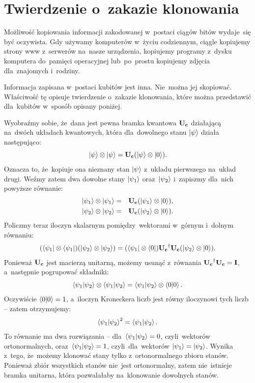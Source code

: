 \section{Twierdzenie o~zakazie klonowania}
Możliwość kopiowania informacji zakodowanej w~postaci ciągów bitów wydaje~się być oczywista.
Gdy używamy komputerów w~życiu codziennym, ciągle kopiujemy strony www z~serwerów na~nasze urządzenia,
kopiujemy programy z~dysku komputera do~pamięci operacyjnej lub~po~prostu kopiujemy zdjęcia dla~znajomych i~rodziny.

Informacja zapisana w~postaci kubitów jest inna. Nie~można jej skopiować. Właściwość tę opisuje
twierdzenie o~zakazie klonowania, które można przedstawić dla~kubitów w~sposób opisany poniżej.

Wyobraźmy sobie, że~dana jest pewna bramka kwantowa $\mathbf{U_c}$ działającą
na~dwóch układach kwantowych, która dla~dowolnego stanu $\ket{\psi}$
działa następująco:
$$
	\ket{\psi}\otimes \ket{\psi} = \mathbf{U_c} (\ket{\psi}\otimes\ket{0}).
$$
Oznacza to, że~kopiuje ona nieznany stan $\ket{\psi}$ z~układu pierwszego na~układ drugi.
Weźmy zatem dwa dowolne stany $\ket{\psi_1}$ oraz~$\ket{\psi_2}$ i~zapiszmy dla~nich powyższe równanie:
\begin{eqnarray}
	\ket{\psi_1}\otimes \ket{\psi_1} &=& \mathbf{U_c} (\ket{\psi_1}\otimes\ket{0}),\nonumber\\
	\ket{\psi_2}\otimes \ket{\psi_2} &=& \mathbf{U_c} (\ket{\psi_2}\otimes\ket{0}).\nonumber
\end{eqnarray}
Policzmy teraz iloczyn skalarnym pomiędzy~wektorami w~górnym i~dolnym równaniu:
$$
	(\bra{\psi_1}\otimes \bra{\psi_1})(\ket{\psi_2}\otimes \ket{\psi_2}) =  (\bra{\psi_1}\otimes\bra{0}) \mathbf{U_c}^\dagger \mathbf{U_c} (\ket{\psi_2}\otimes\ket{0}).
$$
Ponieważ $\mathbf{U_c}$ jest macierzą unitarną, możemy usunąć z~równania $\mathbf{U_c}^\dagger \mathbf{U_c} =\mathbf{I}$, a~następnie pogrupować składniki:
$$
	\braket{\psi_1}{\psi_2} \otimes \braket{\psi_1}{\psi_2} =  \braket{\psi_1}{\psi_2}\otimes\braket{0}{0}.
$$
Oczywiście $\braket{0}{0}=1$, a~iloczyn Kroneckera liczb jest równy iloczynowi tych liczb -- zatem otrzymujemy:
$$
	\braket{\psi_1}{\psi_2}^2 = \braket{\psi_1}{\psi_2}.
$$
To równanie ma dwa rozwiązania -- dla~$\braket{\psi_1}{\psi_2}=0$, czyli~wektorów
ortonormalnych, oraz~$\braket{\psi_1}{\psi_2}=1$, czyli~dla~wektorów $\ket{\psi_1}=\ket{\psi_2}$.
Wynika z~tego, że~możemy klonować stany tylko z~ortonormalnego zbioru stanów. Ponieważ
zbiór wszystkich stanów nie~jest ortonormalny, zatem nie~istnieje bramka unitarna,
która pozwalałaby na~klonowanie dowolnych stanów.

